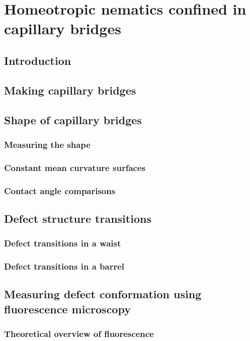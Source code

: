 \chapter{Homeotropic nematics confined in capillary bridges}

\section{Introduction}

\section{Making capillary bridges}

\section{Shape of capillary bridges}
\subsection{Measuring the shape}
\subsection{Constant mean curvature surfaces}
\subsection{Contact angle comparisons}

\section{Defect structure transitions}
\subsection{Defect transitions in a waist}
\subsection{Defect transitions in a barrel}

\section{Measuring defect conformation using fluorescence microscopy}
\subsection{Theoretical overview of fluorescence}

